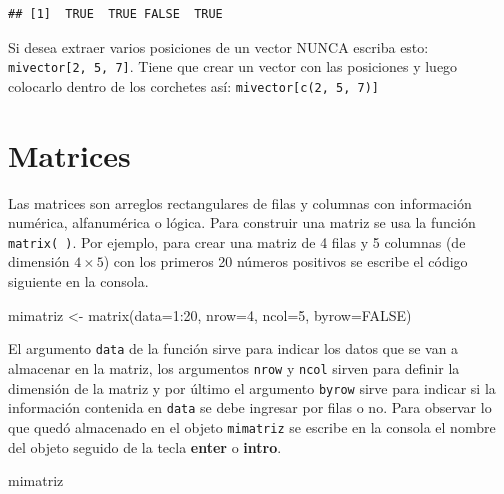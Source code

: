\documentclass[
]{book}
\makeatletter
\newenvironment{Shaded}{\begin{snugshade}}{\end{snugshade}}
\newcommand{\AttributeTok}[1]{\textcolor[rgb]{0.77,0.63,0.00}{#1}}
\newcommand{\ConstantTok}[1]{\textcolor[rgb]{0.00,0.00,0.00}{#1}}
\newcommand{\DecValTok}[1]{\textcolor[rgb]{0.00,0.00,0.81}{#1}}
\newcommand{\FunctionTok}[1]{\textcolor[rgb]{0.00,0.00,0.00}{#1}}
\newcommand{\NormalTok}[1]{#1}
\newcommand{\OtherTok}[1]{\textcolor[rgb]{0.56,0.35,0.01}{#1}}
\newcommand{\SpecialCharTok}[1]{\textcolor[rgb]{0.00,0.00,0.00}{#1}}
\newenvironment{kframe}{%
\medskip{}
\setlength{\fboxsep}{.8em}
 \def\at@end@of@kframe{}%
 \ifinner\ifhmode%
  \def\at@end@of@kframe{\end{minipage}}%
  \begin{minipage}{\columnwidth}%
 \fi\fi%
 \def\FrameCommand##1{\hskip\@totalleftmargin \hskip-\fboxsep
 \colorbox{shadecolor}{##1}\hskip-\fboxsep
     \hskip-\linewidth \hskip-\@totalleftmargin \hskip\columnwidth}%
 \MakeFramed {\advance\hsize-\width
   \@totalleftmargin\z@ \linewidth\hsize
   \@setminipage}}%
 {\par\unskip\endMakeFramed%
 \at@end@of@kframe}
\renewenvironment{Shaded}{\begin{kframe}}{\end{kframe}}
\newenvironment{rmdblock}[1]
  {
  \begin{itemize}
  \renewcommand{\labelitemi}{
    \raisebox{-.7\height}[0pt][0pt]{
      {\setkeys{Gin}{width=3em,keepaspectratio}\texttt{[image: images/\#1]}}
    }
  }
  \setlength{\fboxsep}{1em}
  \begin{kframe}
  \item
  }
  {
  \end{kframe}
  \end{itemize}
  }
\newenvironment{rmdwarning}
  {\begin{rmdblock}{warning}}
  {\end{rmdblock}}
\makeatother
\begin{document}
\begin{verbatim}
## [1]  TRUE  TRUE FALSE  TRUE
\end{verbatim}

\begin{rmdwarning}
Si desea extraer varios posiciones de un vector NUNCA escriba esto: \texttt{mivector{[}2,\ 5,\ 7{]}}. Tiene que crear un vector con las posiciones y luego colocarlo dentro de los corchetes así: \texttt{mivector{[}c(2,\ 5,\ 7){]}}
\end{rmdwarning}

\hypertarget{matrices}{%
\section{Matrices}\label{matrices}}

Las matrices  son arreglos rectangulares de filas y columnas con información numérica, alfanumérica o lógica. Para construir una matriz se usa la función \texttt{matrix(\ )}. Por ejemplo, para crear una matriz de 4 filas y 5 columnas (de dimensión \(4 \times 5\)) con los primeros 20 números positivos se escribe el código siguiente en la consola.

\begin{Shaded}
\begin{Highlighting}[]
\NormalTok{mimatriz }\OtherTok{\textless{}{-}} \FunctionTok{matrix}\NormalTok{(}\AttributeTok{data=}\DecValTok{1}\SpecialCharTok{:}\DecValTok{20}\NormalTok{, }\AttributeTok{nrow=}\DecValTok{4}\NormalTok{, }\AttributeTok{ncol=}\DecValTok{5}\NormalTok{, }\AttributeTok{byrow=}\ConstantTok{FALSE}\NormalTok{)}
\end{Highlighting}
\end{Shaded}

El argumento \texttt{data} de la función sirve para indicar los datos que se van a almacenar en la matriz, los argumentos \texttt{nrow} y \texttt{ncol} sirven para definir la dimensión de la matriz y por último el argumento \texttt{byrow} sirve para indicar si la información contenida en \texttt{data} se debe ingresar por filas o no. Para observar lo que quedó almacenado en el objeto \texttt{mimatriz} se escribe en la consola el nombre del objeto seguido de la tecla \textbf{enter} o \textbf{intro}.

\begin{Shaded}
\begin{Highlighting}[]
\NormalTok{mimatriz}
\end{Highlighting}
\end{Shaded}
\end{document}

